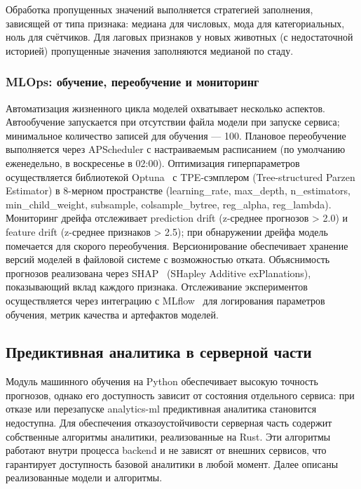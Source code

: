 Обработка пропущенных значений выполняется стратегией заполнения, зависящей от типа признака: медиана для числовых, мода для категориальных, ноль для счётчиков. Для лаговых признаков у новых животных (с недостаточной историей) пропущенные значения заполняются медианой по стаду.

\subsubsection{MLOps: обучение, переобучение и мониторинг}

Автоматизация жизненного цикла моделей охватывает несколько аспектов. Автообучение запускается при отсутствии файла модели при запуске сервиса; минимальное количество записей для обучения --- 100. Плановое переобучение выполняется через APScheduler с настраиваемым расписанием (по умолчанию еженедельно, в воскресенье в 02:00). Оптимизация гиперпараметров осуществляется библиотекой Optuna~\cite{Optuna} с TPE-сэмплером (Tree-structured Parzen Estimator) в 8-мерном пространстве (learning\_rate, max\_depth, n\_estimators, min\_child\_weight, subsample, colsample\_bytree, reg\_alpha, reg\_lambda). Мониторинг дрейфа отслеживает prediction drift (z-среднее прогнозов > 2.0) и feature drift (z-среднее признаков > 2.5); при обнаружении дрейфа модель помечается для скорого переобучения. Версионирование обеспечивает хранение версий моделей в файловой системе с возможностью отката. Объяснимость прогнозов реализована через SHAP~\cite{SHAP} (SHapley Additive exPlanations), показывающий вклад каждого признака. Отслеживание экспериментов осуществляется через интеграцию с MLflow~\cite{MLflow} для логирования параметров обучения, метрик качества и артефактов моделей.

\subsection{Предиктивная аналитика в серверной части}

Модуль машинного обучения на Python обеспечивает высокую точность прогнозов, однако его доступность зависит от состояния отдельного сервиса: при отказе или перезапуске analytics-ml предиктивная аналитика становится недоступна. Для обеспечения отказоустойчивости серверная часть содержит собственные алгоритмы аналитики, реализованные на Rust. Эти алгоритмы работают внутри процесса backend и не зависят от внешних сервисов, что гарантирует доступность базовой аналитики в любой момент. Далее описаны реализованные модели и алгоритмы.


